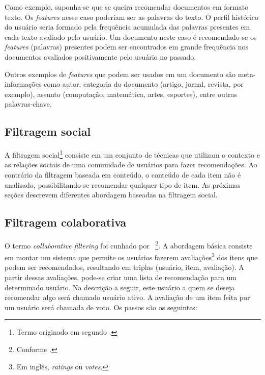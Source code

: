 Como exemplo, suponha-se que se queira recomendar documentos em formato texto. Os \textit{features} nesse caso poderiam ser as palavras do texto. O perfil histórico do usuário seria formado pela frequência acumulada das palavras presentes em cada texto avaliado pelo usuário. Um documento neste caso é recomendado se os \textit{features} (palavras) presentes podem ser encontrados em grande frequência nos documentos avaliados positivamente pelo usuário no passado.

Outros exemplos de \textit{features} que podem ser usados em um documento são meta-informações como autor, categoria do documento (artigo, jornal, revista, por exemplo), assunto (computação, matemática, artes, esportes), entre outras palavras-chave.


\subsection{Filtragem social} %


A filtragem social\footnote{Termo originado em \cite{Malone87} segundo \cite{Hill95}.} consiste em um conjunto de técnicas que utilizam o contexto e as relações sociais de uma comunidade de usuários para fazer recomendações. Ao contrário da filtragem baseada em conteúdo, o conteúdo de cada item não é analisado, possibilitando-se recomendar qualquer tipo de item. As próximas seções descrevem diferentes abordagem baseadas na filtragem social.

\subsection{Filtragem colaborativa}

O termo \textit{collaborative filtering} foi cunhado por \cite{Goldberg92}~\footnote{Conforme \cite{Resnick97}.}. A abordagem básica consiste em montar um sistema que permite os usuários fazerem avaliações\footnote{Em inglês, \textit{ratings} ou \textit{votes}.} dos itens que podem ser recomendados, resultando em triplas (usuário, item, avaliação). A partir dessas avaliações, pode-se criar uma lista de recomendação para um determinado usuário. Na descrição a seguir, este usuário a quem se deseja recomendar algo será chamado usuário ativo. A avaliação de um item feita por um usuário será chamada de voto. Os passos são os seguintes:

